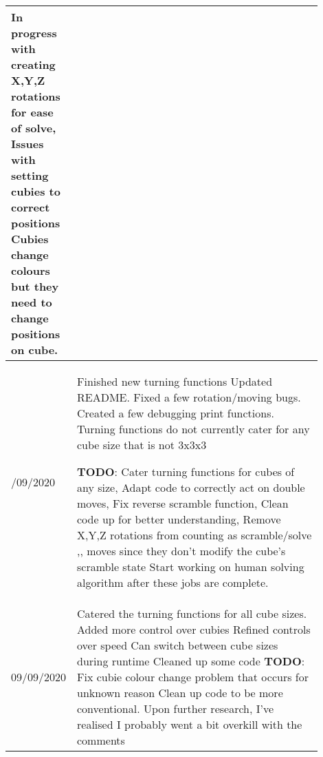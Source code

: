 \documentclass[10pt]{article} %
\begin{document}
\begin{table}[!ht]
\begin{tabular}{
        |>{\centering\arraybackslash}p{0.1\linewidth}
        |p{0.8\linewidth}|}
    In progress with creating X,Y,Z rotations for ease of solve, \newline
    Issues with setting cubies to correct positions
    Cubies change colours but they need to change positions on cube.
    \\ \hline
    04/09/2020  &
    Finished new turning functions  \newline
    Updated README. \newline
    Fixed a few rotation/moving bugs.   \newline
    Created a few debugging print functions.    \newline
    Turning functions do not currently cater for any cube size that is not 3x3x3    \newline

    \textbf{TODO}:
    Cater turning functions for cubes of any size, \newline
    Adapt code to correctly act on double moves,    \newline
    Fix reverse scramble function,  \newline
    Clean code up for better understanding, \newline
    Remove X,Y,Z rotations from counting as scramble/solve ,, \newline moves since they don't modify the cube's scramble state
    Start working on human solving algorithm after these jobs are complete.
    \\ \hline
    09/09/2020  &
    Catered the turning functions for all cube sizes. \newline
    Added more control over cubies  \newline
    Refined controls over speed \newline
    Can switch between cube sizes during runtime    \newline
    Cleaned up some code    \newline
    \textbf{TODO}:
    Fix cubie colour change problem that occurs for unknown reason  \newline
    Clean up code to be more conventional. Upon further research, I've realised I probably went a bit overkill with the comments
    \\ \hline
    \end{tabular}
\end{table}
\end{document}
